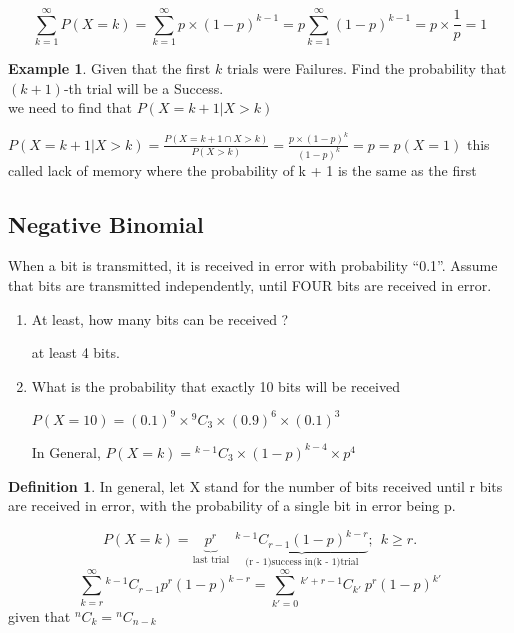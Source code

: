 \documentclass[12pt]{article}
\theoremstyle{definition}
\newtheorem{exmp}{Example}[section]
\newtheorem{slo}{Definition}[section]
\newcommand*{\Comb}[2]{{}^{#1}C_{#2}}%
\begin{document}
\begin{equation}
    \displaystyle \sum_{k = 1}^{\infty}   P(X = k) = \sum_{k = 1}^{\infty}p \times (1 - p)^{k-1}
    = p\sum_{k = 1}^{\infty}(1 - p)^{k-1} = p \times \frac{1}{p} = 1
\end{equation}    
\begin{exmp}
    Given that the first $k$ trials were Failures. Find the probability that $(k+1)$-th trial will be a Success. \\

    we need to find that $P(X = k + 1 | X > k)$
    \begin{center}
        $ \displaystyle  P(X = k + 1 | X > k) = \frac{P(X=k+1 \cap X>k)}{P(X>k)}
        = \frac{p \times (1-p)^k}{(1-p)^k} = p = p(X = 1)$  this called lack of memory where the probability
        of k + 1 is the same as the first
\end{center}
\end{exmp}    
\subsection{Negative Binomial}
When a bit is transmitted, it is received in error with probability “0.1”.
Assume that bits are transmitted independently, until FOUR bits are received in error.
\begin{enumerate}
    \item At least, how many bits can be received ?
        \begin{center}
            at least 4 bits.
        \end{center}   
    \item What is the probability that exactly 10 bits will be received
        \begin{center}
            $  P(X= 10) = (0.1)^9 \times \Comb{9}{3} \times (0.9)^6 \times (0.1)^3 $
        \end{center}   
        In General, $P(X = k) = \Comb{k-1}{3} \times (1-p)^{k-4} \times p^4$

\end{enumerate}   
\begin{slo}
 In general, let X stand for the number of bits
received until r bits are received in error, with
the probability of a single bit in error being p.
\end{slo}   
\begin{equation}
    P(X = k) =  \underbrace{p^r}_{\text{last trial}} 
    \ \ \underbrace{\Comb{k-1}{r-1} (1-p)^{k-r}}_{\text{(r - 1)success in(k - 1)trial}}; \ \ k \geq r. 
\end{equation}
\begin{equation}
    \displaystyle \sum_{k=r}^{\infty} \Comb{k-1}{r-1} p^r(1-p)^{k-r} =
    \sum_{k' = 0}^{\infty} \Comb{k' + r -1}{k'} \ p^r (1-p)^{k'}
\end{equation}
given that $ \displaystyle \Comb{n}{k} = \Comb{n}{n- k}$
\end{document}
